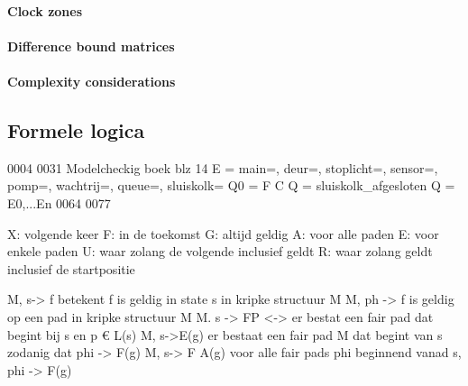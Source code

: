 \paragraph{Clock zones}
\paragraph{Difference bound matrices}
\paragraph{Complexity considerations}








	
\subsection{Formele logica}

0004
0031
Modelcheckig boek blz 14
E = {main={},
	deur={},
	stoplicht={},
	sensor={},
	pomp={},
	wachtrij={},
	queue={},
	sluiskolk={}
}
Q0 =
F C Q = sluiskolk_afgesloten
Q = E0,...En
0064
0077



X: volgende keer
F: in de toekomst
G: altijd geldig
A: voor alle paden
E: voor enkele paden
U: waar zolang de volgende inclusief geldt
R: waar zolang geldt inclusief de startpositie

M, s-> f betekent f is geldig in state s in kripke structuur M
M, ph -> f is geldig op een pad in kripke structuur M
M. s -> FP <-> er bestat een fair pad dat begint bij s en p € L(s)
M, s->E(g) er bestaat een fair pad M dat begint van s zodanig dat phi -> F(g)
M, s-> F A(g) voor alle fair pads phi beginnend vanad s,  phi -> F(g)






 
 





